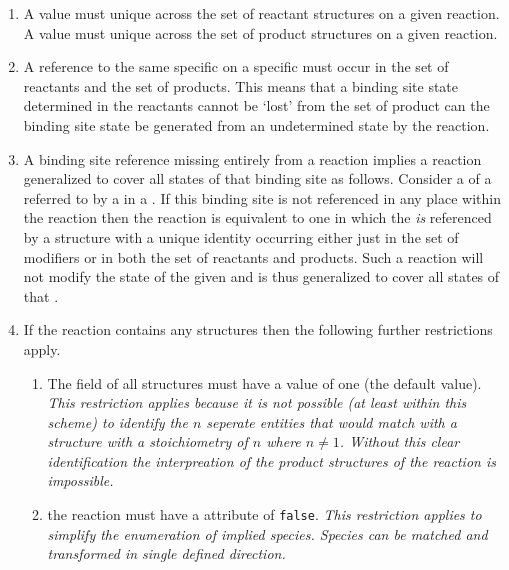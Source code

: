 \documentclass{cekarticle}
\begin{document}
\begin{enumerate}

\item A   value must unique
across the set of reactant  structures on
a given reaction. A   value
must unique across the set of product 
structures on a given reaction.

\item A reference to the same specific  on a
specific  must occur in the set of
reactants and the set of products.  This means that a binding site
state determined in the reactants cannot be `lost' from the set of
product can the binding site state be generated from an
undetermined state by the reaction.

\item A binding site reference missing entirely from a reaction
implies a reaction generalized to cover all states of that binding
site as follows. Consider a  of a
 referred to by a 
in a .  If this binding site is not referenced in
any place within the reaction then the reaction is equivalent to
one in which the  \emph{is} referenced by a
 structure with a unique identity occurring
either just in the set of modifiers or in both the set of
reactants and products.  Such a reaction will not modify the state
of the given  and is thus generalized to cover
all states of that .

\item If the reaction contains any  structures
then the following further restrictions apply.

\begin{enumerate}

\item The  field of all
 structures must have a value of one (the
default value).  \emph{This restriction applies because it is not
possible (at least within this scheme) to identify the $n$
seperate entities that would match with a 
structure with a stoichiometry of $n$ where $n \neq 1$.  Without
this clear identification the interpreation of the product
structures of the reaction is impossible.}

\item the reaction must have a  attribute of
\texttt{false}. \emph{This restriction applies to simplify the
enumeration of implied species.  Species can be matched and
transformed in single defined direction.}

\end{enumerate}

\end{enumerate}
\end{document}
